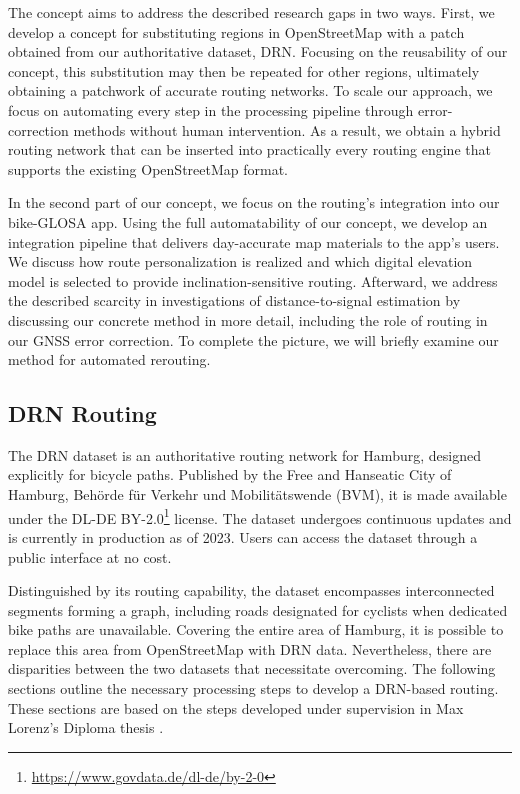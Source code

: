 The concept aims to address the described research gaps in two ways. First, we develop a concept for substituting regions in OpenStreetMap with a patch obtained from our authoritative dataset, DRN. Focusing on the reusability of our concept, this substitution may then be repeated for other regions, ultimately obtaining a patchwork of accurate routing networks. To scale our approach, we focus on automating every step in the processing pipeline through error-correction methods without human intervention. As a result, we obtain a hybrid routing network that can be inserted into practically every routing engine that supports the existing OpenStreetMap format.

In the second part of our concept, we focus on the routing's integration into our bike-GLOSA app. Using the full automatability of our concept, we develop an integration pipeline that delivers day-accurate map materials to the app's users. We discuss how route personalization is realized and which digital elevation model is selected to provide inclination-sensitive routing. Afterward, we address the described scarcity in investigations of distance-to-signal estimation by discussing our concrete method in more detail, including the role of routing in our GNSS error correction. To complete the picture, we will briefly examine our method for automated rerouting.

\subsection{DRN Routing}\label{sec:lorenz1}

The DRN dataset is an authoritative routing network for Hamburg, designed explicitly for bicycle paths. Published by the Free and Hanseatic City of Hamburg, Behörde für Verkehr und Mobilitätswende (BVM), it is made available under the DL-DE BY-2.0\footnote{\url{https://www.govdata.de/dl-de/by-2-0}} license. The dataset undergoes continuous updates and is currently in production as of 2023. Users can access the dataset through a public interface at no cost. 

Distinguished by its routing capability, the dataset encompasses interconnected segments forming a graph, including roads designated for cyclists when dedicated bike paths are unavailable. Covering the entire area of Hamburg, it is possible to replace this area from OpenStreetMap with DRN data. Nevertheless, there are disparities between the two datasets that necessitate overcoming. The following sections outline the necessary processing steps to develop a DRN-based routing. These sections are based on the steps developed under supervision in Max Lorenz's Diploma thesis \cite{lorenz_2022}.

